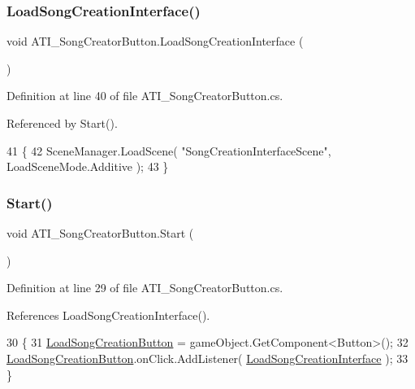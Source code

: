\subsubsection{\texorpdfstring{Load\+Song\+Creation\+Interface()}{LoadSongCreationInterface()}}
{\footnotesize\ttfamily void A\+T\+I\+\_\+\+Song\+Creator\+Button.\+Load\+Song\+Creation\+Interface (\begin{DoxyParamCaption}{ }\end{DoxyParamCaption})\hspace{0.3cm}{\ttfamily [private]}}



Definition at line 40 of file A\+T\+I\+\_\+\+Song\+Creator\+Button.\+cs.



Referenced by Start().


\begin{DoxyCode}
41     \{
42         SceneManager.LoadScene( \textcolor{stringliteral}{"SongCreationInterfaceScene"}, LoadSceneMode.Additive );
43     \}
\end{DoxyCode}
\mbox{\label{class_a_t_i___song_creator_button_a70e91a092e195182c79f0111dd118f2a}} 
\subsubsection{\texorpdfstring{Start()}{Start()}}
{\footnotesize\ttfamily void A\+T\+I\+\_\+\+Song\+Creator\+Button.\+Start (\begin{DoxyParamCaption}{ }\end{DoxyParamCaption})\hspace{0.3cm}{\ttfamily [private]}}



Definition at line 29 of file A\+T\+I\+\_\+\+Song\+Creator\+Button.\+cs.



References Load\+Song\+Creation\+Interface().


\begin{DoxyCode}
30     \{
31         \hyperlink{class_a_t_i___song_creator_button_af47eac9d1ed3a74d49a511fdbd57ff3e}{LoadSongCreationButton} = gameObject.GetComponent<Button>();
32         \hyperlink{class_a_t_i___song_creator_button_af47eac9d1ed3a74d49a511fdbd57ff3e}{LoadSongCreationButton}.onClick.AddListener( 
      \hyperlink{class_a_t_i___song_creator_button_a6c024ae05ba70e847779b7a194611eb5}{LoadSongCreationInterface} );
33     \}
\end{DoxyCode}


